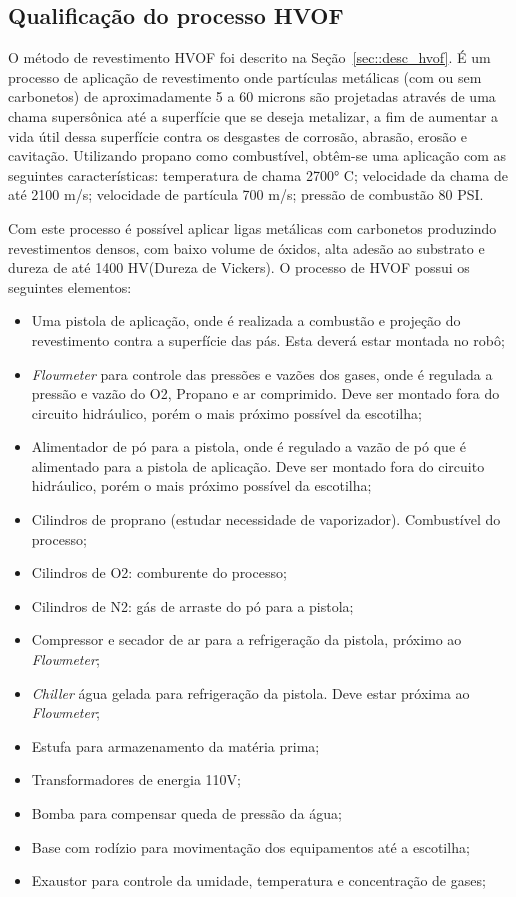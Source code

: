 \subsection{Qualificação do processo HVOF}

O método de revestimento HVOF foi descrito na Seção~\ref{sec::desc_hvof}. É um
processo de aplicação de revestimento onde partículas metálicas (com ou sem carbonetos) de
aproximadamente 5 a 60 microns são projetadas através de uma chama supersônica
até a superfície que se deseja metalizar, a fim de aumentar a vida útil dessa
superfície contra os desgastes de corrosão, abrasão, erosão e cavitação.
Utilizando propano como combustível, obtêm-se uma aplicação com as seguintes
características: temperatura de chama 2700° C; velocidade da chama de até 2100
m/s; velocidade de partícula 700 m/s; pressão de combustão 80 PSI.

Com este processo é possível aplicar ligas metálicas com carbonetos produzindo
revestimentos densos, com baixo volume de óxidos, alta adesão ao substrato e
dureza de até 1400 HV(Dureza de Vickers). O processo de HVOF possui os seguintes
elementos:

\begin{itemize}
\item Uma pistola de aplicação, onde é realizada a combustão e projeção do
revestimento contra a superfície das pás. Esta deverá estar montada no robô;
\item \textit{Flowmeter} para controle das pressões e vazões dos gases, onde é
regulada a pressão e vazão do O2, Propano e ar comprimido. Deve ser montado
fora do circuito hidráulico, porém o mais próximo possível da escotilha;
\item Alimentador de pó para a pistola, onde é regulado a vazão de pó que é
alimentado para a pistola de aplicação. Deve ser montado fora do circuito
hidráulico, porém o mais próximo possível da escotilha;
\item Cilindros de proprano (estudar necessidade de vaporizador). Combustível 
do processo;
\item Cilindros de O2: comburente do processo;
\item Cilindros de N2: gás de arraste do pó para a pistola;
\item Compressor e secador de ar para a refrigeração da pistola, próximo ao
\textit{Flowmeter};
\item \textit{Chiller} água gelada para refrigeração da pistola. Deve estar
próxima ao \textit{Flowmeter};
\item Estufa para armazenamento da matéria prima;
\item Transformadores de energia 110V;
\item Bomba para compensar queda de pressão da água;
\item Base com rodízio para movimentação dos equipamentos até a escotilha;
\item Exaustor para controle da umidade, temperatura e concentração de gases;
\end{itemize}
 
